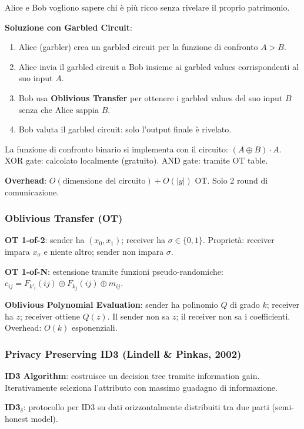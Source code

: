 \documentclass[a4paper,11pt]{article}
\begin{document}
Alice e Bob vogliono sapere chi \`{e} pi\`{u} ricco senza rivelare il proprio patrimonio.

\textbf{Soluzione con Garbled Circuit}:
\begin{enumerate}
  \item Alice (garbler) crea un garbled circuit per la funzione di confronto $A > B$.
  \item Alice invia il garbled circuit a Bob insieme ai garbled values corrispondenti al suo input $A$.
  \item Bob usa \textbf{Oblivious Transfer} per ottenere i garbled values del suo input $B$ senza che Alice sappia $B$.
  \item Bob valuta il garbled circuit: solo l'output finale \`{e} rivelato.
\end{enumerate}

La funzione di confronto binario si implementa con il circuito: $(A \oplus B) \cdot A$. XOR gate: calcolato localmente (gratuito). AND gate: tramite OT table.

\textbf{Overhead}: $O(\text{dimensione del circuito}) + O(|y|)$ OT. Solo 2 round di comunicazione.

\subsubsection*{Oblivious Transfer (OT)}

\textbf{OT 1-of-2}: sender ha $(x_0, x_1)$; receiver ha $\sigma \in \{0,1\}$. Propriet\`{a}: receiver impara $x_\sigma$ e niente altro; sender non impara $\sigma$.

\textbf{OT 1-of-N}: estensione tramite funzioni pseudo-randomiche: $c_{ij} = F_{k'_i}(ij) \oplus F_{k_j}(ij) \oplus m_{ij}$.

\textbf{Oblivious Polynomial Evaluation}: sender ha polinomio $Q$ di grado $k$; receiver ha $z$; receiver ottiene $Q(z)$. Il sender non sa $z$; il receiver non sa i coefficienti. Overhead: $O(k)$ esponenziali.

\subsubsection*{Privacy Preserving ID3 (Lindell \& Pinkas, 2002)}

\textbf{ID3 Algorithm}: costruisce un decision tree tramite information gain. Iterativamente seleziona l'attributo con massimo guadagno di informazione.

\textbf{ID3$_\delta$}: protocollo per ID3 su dati orizzontalmente distribuiti tra due parti (semi-honest model).
\end{document}
